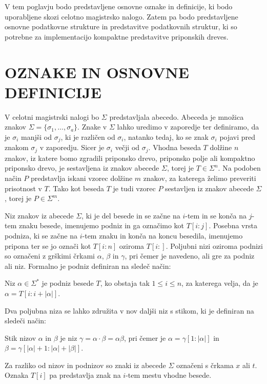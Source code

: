 
V tem poglavju bodo predstavljene osnovne oznake in definicije, ki bodo uporabljene skozi celotno magistrsko nalogo. Zatem pa bodo predstavljene osnovne podatkovne strukture in predstavitve podatkovnih struktur, ki so potrebne za implementacijo kompaktne predstavitve priponskih dreves.


\section{OZNAKE IN OSNOVNE DEFINICIJE}\label{sec:def}
V celotni magistrski nalogi bo $\Sigma$ predstavljala abecedo. Abeceda je množica znakov $\Sigma=\{\sigma_1,\dots,\sigma_a\}$. Znake v $\Sigma$ lahko uredimo v zaporedje ter definiramo, da je $\sigma_i$ manjši od $\sigma_j$, ki je različen od $\sigma_i$, natanko tedaj, ko se znak $\sigma_i$ pojavi pred znakom $\sigma_j$ v zaporedju. Sicer je $\sigma_i$ večji od $\sigma_j$.
Vhodna beseda $T$ dolžine $n$ znakov, iz katere bomo zgradili priponsko drevo, priponsko polje ali kompaktno priponsko drevo, je sestavljena iz znakov abecede $\Sigma$, torej je $T\in\Sigma^n$. Na podoben način $P$ predstavlja iskani vzorec dolžine $m$ znakov, za katerega želimo preveriti prisotnost v $T$. Tako kot beseda $T$ je tudi vzorec $P$ sestavljen iz znakov abecede $\Sigma$, torej je $P\in\Sigma^m$.

Niz znakov iz abecede $\Sigma$, ki je del besede in se začne na $i$-tem in se konča na $j$-tem znaku besede, imenujemo podniz in ga označimo kot $T[i:j]$. Posebna vrsta podniza, ki se začne na $i$-tem znaku in konča na koncu besedila, imenujemo pripona ter se jo označi kot $T[i:n]$ oziroma $T[i:]$. Poljubni nizi oziroma podnizi so označeni z grškimi črkami $\alpha$, $\beta$ in $\gamma$, pri čemer je navedeno, ali gre za podniz ali niz. Formalno je podniz definiran na sledeč način:
\begin{defi}
    Niz $\alpha\in\Sigma^*$ je podniz besede $T$, ko obstaja tak $1\le i\le n$, za katerega velja, da je  $\alpha=T[i:i+|\alpha|]$. 
\end{defi}
Dva poljubna niza se lahko združita v nov daljši niz s stikom, ki je definiran na sledeči način:
\begin{defi}
    Stik nizov $\alpha$ in $\beta$ je niz $\gamma=\alpha\cdot\beta=\alpha\beta$, pri čemer je $\alpha=\gamma[1:|\alpha|]$ in $\beta=\gamma[|\alpha|+1:|\alpha|+|\beta|]$.
\end{defi}

Za razliko od nizov in podnizov so znaki iz abecede $\Sigma$ označeni s črkama $x$ ali $t$. Oznaka $T[i]$ pa predstavlja znak na $i$-tem mestu vhodne besede.

